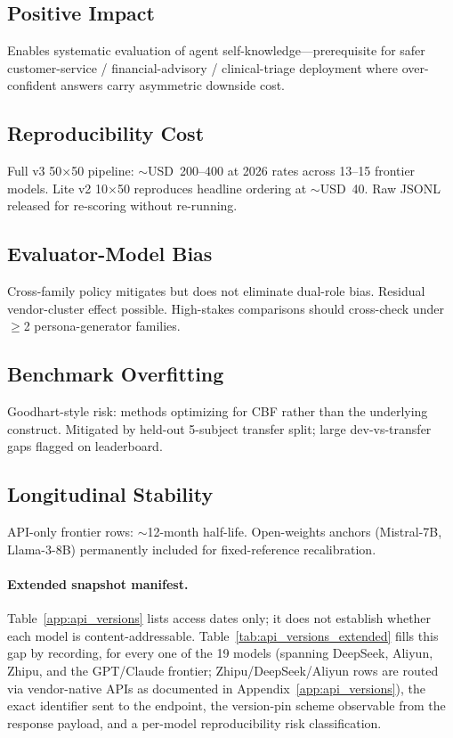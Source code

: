 \documentclass[11pt]{article}
\begin{document}
\subsection*{Positive Impact}
Enables systematic evaluation of agent self-knowledge—prerequisite for safer customer-service / financial-advisory / clinical-triage deployment where over-confident answers carry asymmetric downside cost.

\subsection*{Reproducibility Cost}
Full v3 50$\times$50 pipeline: $\sim$USD~200--400 at 2026 rates across 13--15 frontier models. Lite v2 10$\times$50 reproduces headline ordering at $\sim$USD~40. Raw JSONL released for re-scoring without re-running.

\subsection*{Evaluator-Model Bias}
Cross-family policy mitigates but does not eliminate dual-role bias. Residual vendor-cluster effect possible. High-stakes comparisons should cross-check under $\geq$2 persona-generator families.

\subsection*{Benchmark Overfitting}
Goodhart-style risk: methods optimizing for CBF rather than the underlying construct. Mitigated by held-out 5-subject transfer split; large dev-vs-transfer gaps flagged on leaderboard.

\subsection*{Longitudinal Stability}
API-only frontier rows: $\sim$12-month half-life. Open-weights anchors (Mistral-7B, Llama-3-8B) permanently included for fixed-reference recalibration.



\paragraph{Extended snapshot manifest.} Table~\ref{app:api_versions} lists access dates only; it does not establish whether each model is content-addressable. Table~\ref{tab:api_versions_extended} fills this gap by recording, for every one of the 19 models (spanning DeepSeek, Aliyun, Zhipu, and the GPT/Claude frontier; Zhipu/DeepSeek/Aliyun rows are routed via vendor-native APIs as documented in Appendix~\ref{app:api_versions}), the exact identifier sent to the endpoint, the version-pin scheme observable from the response payload, and a per-model reproducibility risk classification.
\end{document}
